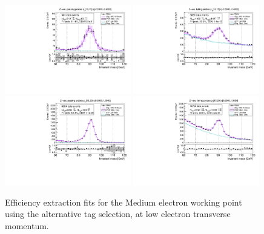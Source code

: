 {\begin{figure}
\centering
\includegraphics[width=0.49\textwidth]{figures/Zee_AltTag_pass_ptBin0_etaBin0.pdf}
\includegraphics[width=0.49\textwidth]{figures/Zee_AltTag_fail_ptBin0_etaBin0.pdf}
\includegraphics[width=0.49\textwidth]{figures/Zee_AltTag_pass_ptBin1_etaBin19.pdf}
\includegraphics[width=0.49\textwidth]{figures/Zee_AltTag_fail_ptBin1_etaBin19.pdf}
\caption{Efficiency extraction fits for the Medium electron working point using the alternative tag selection, at low electron transverse momentum.}
\label{fig:ZeeAltAltTagFits1}
\end{figure}

}
